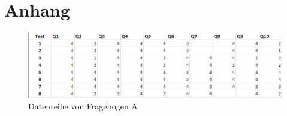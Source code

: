 \chapter{Anhang}
\label{appedixa}
\begin{figure}[h]
	\centering
		\includegraphics[width=1.00\textwidth]{media/tableData.png}
	\caption{Datenreihe von Fragebogen A}
	\label{fig:tableData}
\end{figure}

\clearpage




